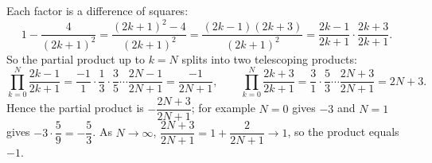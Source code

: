 Each factor is a difference of squares:
\[
1-\dfrac{4}{(2k+1)^2}=\dfrac{(2k+1)^2-4}{(2k+1)^2}=\dfrac{(2k-1)(2k+3)}{(2k+1)^2}=\dfrac{2k-1}{2k+1}\cdot\dfrac{2k+3}{2k+1}.
\]
So the partial product up to $k=N$ splits into two telescoping products:
\[
\prod_{k=0}^{N}\dfrac{2k-1}{2k+1}=\dfrac{-1}{1}\cdot\dfrac{1}{3}\cdot\dfrac{3}{5}\cdots\dfrac{2N-1}{2N+1}=\dfrac{-1}{2N+1},
\qquad
\prod_{k=0}^{N}\dfrac{2k+3}{2k+1}=\dfrac{3}{1}\cdot\dfrac{5}{3}\cdots\dfrac{2N+3}{2N+1}=2N+3 .
\]
Hence the partial product is $-\dfrac{2N+3}{2N+1}$; for example $N=0$ gives $-3$ and $N=1$ gives $-3\cdot\dfrac{5}{9}=-\dfrac{5}{3}$. As $N\to\infty$, $\dfrac{2N+3}{2N+1}=1+\dfrac{2}{2N+1}\to1$, so the product equals $\boxed{-1}$.
